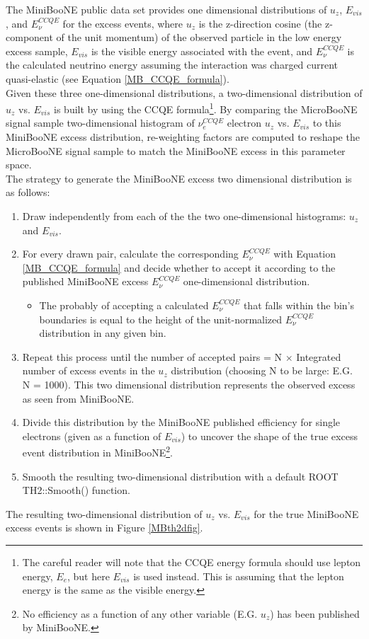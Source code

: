 The MiniBooNE public data set \cite{MB_lee_datarelease} provides one dimensional distributions of $u_z$, $E_{vis}$, and $E_\nu^{CCQE}$ for the excess events, where $u_z$ is the z-direction cosine (the z- component of the unit momentum) of the observed particle in the low energy excess sample, $E_{vis}$ is the visible energy associated with the event, and $E_{\nu}^{CCQE}$ is the calculated neutrino energy assuming the interaction was charged current quasi-elastic (see Equation \ref{MB_CCQE_formula}).\\

Given these three one-dimensional distributions, a two-dimensional distribution of $u_z$ vs. $E_{vis}$ is built by using the CCQE formula\footnote{The careful reader will note that the CCQE energy formula should use lepton energy, $E_e$, but here $E_{vis}$ is used instead. This is assuming that the lepton energy is the same as the visible energy.}. By comparing the MicroBooNE signal sample two-dimensional histogram of $\nu_e^{CCQE}$ electron $u_z$ vs. $E_{vis}$ to this MiniBooNE excess distribution, re-weighting factors are computed to reshape the MicroBooNE signal sample to match the MiniBooNE excess in this parameter space.\\

The strategy to generate the MiniBooNE excess two dimensional distribution is as follows:
\begin{enumerate}
\item Draw independently from each of the the two one-dimensional histograms: $u_z$ and $E_{vis}$.
\item For every drawn pair, calculate the corresponding $E_\nu^{CCQE}$ with Equation \ref{MB_CCQE_formula} and decide whether to accept it according to the published MiniBooNE excess $E_\nu^{CCQE}$ one-dimensional distribution.
	\begin{itemize}
	\item The probably of accepting a calculated $E_\nu^{CCQE}$ that falls within the bin's boundaries is equal to the height of the unit-normalized $E_\nu^{CCQE}$ distribution in any given bin.
	\end{itemize}
\item Repeat this process until the number of accepted pairs = N $\times$ Integrated number of excess events in the $u_z$ distribution (choosing N to be large: E.G. N = 1000). This two dimensional distribution represents the observed excess as seen from MiniBooNE.
\item Divide this distribution by the MiniBooNE published efficiency for single electrons (given as a function of $E_{vis}$) to uncover the shape of the true excess event distribution in MiniBooNE\footnote{No efficiency as a function of any other variable (E.G. $u_z$) has been published by MiniBooNE.}.
\item Smooth the resulting two-dimensional distribution with a default ROOT TH2::Smooth() function.
\end{enumerate}
The resulting two-dimensional distribution of $u_z$ vs. $E_{vis}$ for the true MiniBooNE excess events is shown in Figure \ref{MBth2dfig}.


